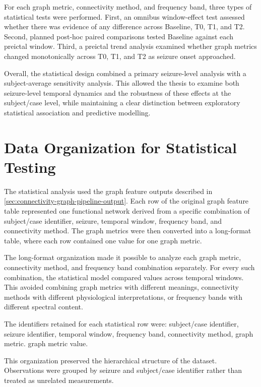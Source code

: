 For each graph metric, connectivity method, and frequency band, three types of
statistical tests were performed. First, an omnibus window-effect test assessed
whether there was evidence of any difference across Baseline, T0, T1, and T2.
Second, planned post-hoc paired comparisons tested Baseline against each
preictal window. Third, a preictal trend analysis examined whether graph
metrics changed monotonically across T0, T1, and T2 as seizure onset
approached.

Overall, the statistical design combined a primary seizure-level analysis with
a subject-average sensitivity analysis. This allowed the thesis to examine both
seizure-level temporal dynamics and the robustness of these effects at the
subject/case level, while maintaining a clear distinction between exploratory
statistical association and predictive modelling.

\section{Data Organization for Statistical Testing}
\label{sec:data-organization-statistical-testing}

The statistical analysis used the graph feature outputs described in
\cref{sec:connectivity-graph-pipeline-output}. Each row of the original graph
feature table represented one functional network derived from a specific
combination of subject/case identifier, seizure, temporal window, frequency
band, and connectivity method. The graph metrics were then converted into a
long-format table, where each row contained one value for one graph metric.

The long-format organization made it possible to analyze each graph metric,
connectivity method, and frequency band combination separately. For every such
combination, the statistical model compared values across temporal windows.
This avoided combining graph metrics with different meanings, connectivity
methods with different physiological interpretations, or frequency bands with
different spectral content.

The identifiers retained for each statistical row were: subject/case identifier,
seizure identifier, temporal window, frequency band, connectivity method, graph metric. graph metric value.

This organization preserved the hierarchical structure of the dataset.
Observations were grouped by seizure and subject/case identifier rather than
treated as unrelated measurements.

